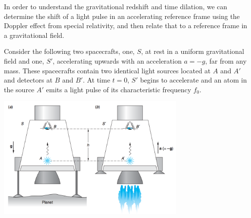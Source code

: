 \documentclass[12pt]{exam}
\begin{document}
\begin{questions}
	
\clearpage
\question In order to understand the gravitational redshift and time dilation, we can determine the shift of a light pulse in an accelerating reference frame using the Doppler effect from special relativity, and then relate that to a reference frame in a gravitational field.

Consider the following two spacecrafts, one, $S$, at rest in a uniform gravitational field and one, $S'$, accelerating upwards with an acceleration $a = -g$, far from any mass. These spacecrafts contain two identical light sources located at $A$ and $A'$ and detectors at $B$ and $B'$. At time $t=0$, $S'$ begins to accelerate and an atom in the source $A'$ emits a light pulse of its characteristic frequency $f_0$.
\begin{center}
				\includegraphics[width=0.7\textwidth]{../images/coop12_redshift.png}
\end{center}	
\begin{parts}

\end{parts}
\end{questions}
\end{document}
